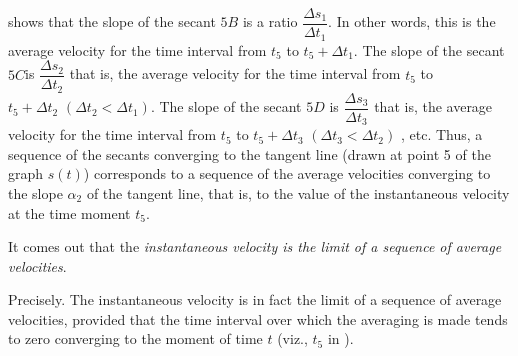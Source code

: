 { shows that the slope of the secant $5B$ is a ratio $\dfrac{\Delta s_{1}}{\Delta t_{1}}$. In other words, this is the average velocity for the time interval from $t_{5}$ to $t_{5} + \Delta t_{1}$. The slope of the secant $5C $is  $\dfrac{\Delta s_{2}}{\Delta t_{2}}$ that is, the average velocity for the time interval from  $t_{5}$ to  $t_{5} + \Delta t_{2} \,\, (\Delta t_{2} < \Delta t_{1})$. The slope of the secant $5D$ is $\dfrac{\Delta s_{3}}{\Delta t_{3}}$ that is, the average velocity for the time interval from $t_{5}$ to  $t_{5} + \Delta t_{3} \,\, (\Delta t_{3} < \Delta t_{2})$ , etc. Thus, a sequence of the secants converging to the tangent line (drawn at point 5 of the graph $s (t)$) corresponds to a sequence of the average velocities converging to the slope $\alpha_{2}$ of the tangent line, that is, to the value of the instantaneous velocity at the time moment $t_{5}$.

\rdr It comes out that the \emph{instantaneous velocity is the limit of a sequence of average velocities}.

\athr Precisely. The instantaneous velocity is in fact the limit of a sequence of average velocities, provided that the time interval over which the averaging is made tends to zero converging to the moment of time $t$ (viz., $t_{5}$ in ).

}

